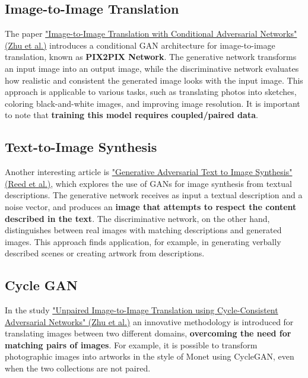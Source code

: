 \subsection{Image-to-Image Translation}

The paper \href{https://arxiv.org/pdf/1611.07004}{"Image-to-Image Translation with Conditional Adversarial Networks" (Zhu et al.)} introduces a conditional GAN architecture for image-to-image translation, known as \textbf{PIX2PIX Network}. The generative network transforms an input image into an output image, while the discriminative network evaluates how realistic and consistent the generated image looks with the input image. This approach is applicable to various tasks, such as translating photos into sketches, coloring black-and-white images, and improving image resolution. It is important to note that \textbf{training this model requires coupled/paired data}.


\subsection{Text-to-Image Synthesis}

Another interesting article is \href{https://arxiv.org/pdf/1605.05396}{"Generative Adversarial Text to Image Synthesis" (Reed et al.)}, which explores the use of GANs for image synthesis from textual descriptions. The generative network receives as input a textual description and a noise vector, and produces an \textbf{image that attempts to respect the content described in the text}. The discriminative network, on the other hand, distinguishes between real images with matching descriptions and generated images. This approach finds application, for example, in generating verbally described scenes or creating artwork from descriptions.

\subsection{Cycle GAN}



In the study \href{https://arxiv.org/pdf/1703.10593}{"Unpaired Image-to-Image Translation using Cycle-Consistent Adversarial Networks" (Zhu et al.)} an innovative methodology is introduced for translating images between two different domains, \textbf{overcoming the need for matching pairs of images}. For example, it is possible to transform photographic images into artworks in the style of Monet using CycleGAN, even when the two collections are not paired.

